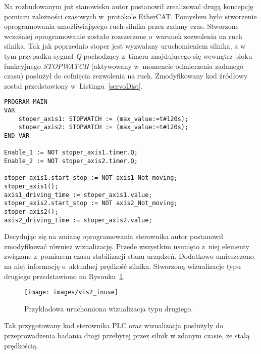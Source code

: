Na rozbudowanym już stanowisku autor postanowił zrealizować drugą koncepcję pomiaru zależności czasowych w~protokole EtherCAT. Pomysłem było stworzenie oprogramowania umożliwiającego ruch silnika przez zadany czas. Stworzone wcześniej oprogramowanie zostało rozszerzone o~warunek zezwolenia na ruch silnika. Tak jak poprzednio stoper jest wyzwalany uruchomieniem silnika, a w tym przypadku sygnał \textit{Q} pochodzący z~timera znajdującego się wewnątrz bloku funkcyjnego \textit{STOPWATCH} (aktywowany w~momencie odmierzenia zadanego czasu) posłużył do cofnięcia zezwolenia na ruch. Zmodyfikowany kod źródłowy został przedstawiony w~Listingu~\ref{servoDist}.

\vspace{5mm}
\begin{lstlisting}[caption={Oprogramowanie odmierzające drogę przebytą w zadanym czasie.},label=servoDist]
PROGRAM MAIN
VAR
	stoper_axis1: STOPWATCH := (max_value:=t#120s);
	stoper_axis2: STOPWATCH := (max_value:=t#120s);
END_VAR

Enable_1 := NOT stoper_axis1.timer.Q;
Enable_2 := NOT stoper_axis2.timer.Q;

stoper_axis1.start_stop := NOT axis1_Not_moving;
stoper_axis1();
axis1_driving_time := stoper_axis1.value;
stoper_axis2.start_stop := NOT axis2_Not_moving;
stoper_axis2();
axis2_driving_time := stoper_axis2.value;
\end{lstlisting}

\clearpage
Decydując się na zmianę oprogramowania sterownika autor postanowił zmodyfikować również wizualizację. Przede wszystkim usunięto z~niej elementy związane z~pomiarem czasu stabilizacji stanu urządzeń. Dodatkowo umieszczono na niej informację o~aktualnej prędkość silnika.
Stworzoną wizualizacje typu drugiego przedstawiono na Rysunku~\ref{vis2_inuse}.
\begin{figure}[!htb] 	\centering 	\texttt{[image: images/vis2\_inuse]} \caption{Przykładowa uruchomiona wizualizacja typu drugiego.} \label{vis2_inuse} \end{figure}

Tak przygotowany kod sterownika PLC oraz wizualizacja posłużyły do przeprowadzenia badania drogi przebytej przez silnik w zdanym czasie, ze stałą prędkością. 
%
%

